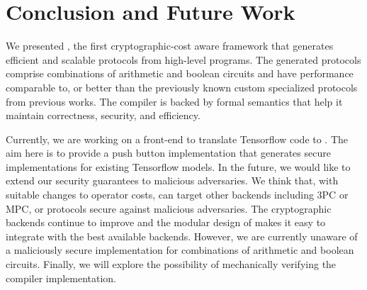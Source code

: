 \section{Conclusion and Future Work}
\label{sec:conclude}

We presented \tool, the first
cryptographic-cost aware framework that generates efficient and
scalable \mpc protocols from high-level programs.
The generated protocols comprise combinations
of arithmetic and boolean circuits and have performance comparable to, or better than the previously known custom specialized
protocols from previous works.
The compiler is backed by formal semantics that help 
it maintain correctness, security,
and efficiency.

Currently, we are working on a front-end to translate Tensorflow code
to \tool. The aim here is to provide a push button implementation
that generates secure implementations for existing Tensorflow models. 
In the future, we would like to extend our security guarantees to
malicious adversaries. We think that, with suitable
changes to operator costs, \tool can target other backends including 3PC or
MPC, or protocols secure against malicious adversaries.
 The cryptographic backends continue to improve and the modular design of \tool makes it easy to integrate with the best available backends.
However, we are currently unaware of a maliciously secure \mpc implementation for combinations of
arithmetic and boolean circuits.
Finally, we will explore the possibility of mechanically verifying the  compiler implementation.






